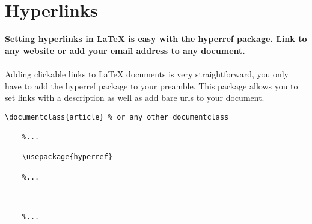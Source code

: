 
\maketitle
\newpage
\section{Hyperlinks}
  \textbf{
    Setting hyperlinks in LaTeX is easy with the hyperref package. Link to any website or add your email address to any document.
  }
  
  \paragraph{}
  Adding clickable links to LaTeX documents is very straightforward, you only have to add the hyperref package to your preamble. This package allows you to set links with a description as well as add bare urls to your document.

  \begin{lstlisting}[language={[LaTeX]TeX},breaklines=true,frame=single]
    \documentclass{article} % or any other documentclass

    %...
    
    \usepackage{hyperref}
    
    %...
    
    
    
    %...
    
    
  \end{lstlisting}
